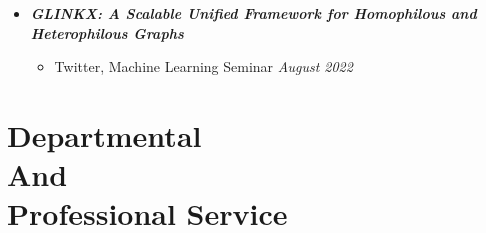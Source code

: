 \documentclass[margin]{res}
\newcommand{\bemph}[1]{\textbf{\emph{#1}}}
\begin{document}
\begin{resume}
\begin{itemize}[nosep]
%	
	\item \bemph{GLINKX: A Scalable Unified Framework for Homophilous and Hetero\-philous Graphs}
	\begin{itemize}[nosep]
		\item Twitter, Machine Learning Seminar \hfill \emph{August 2022}
		
	\end{itemize}

 

	
	
\end{itemize}

\section{Departmental \\ And \\Professional Service}


\end{resume}
\end{document}
